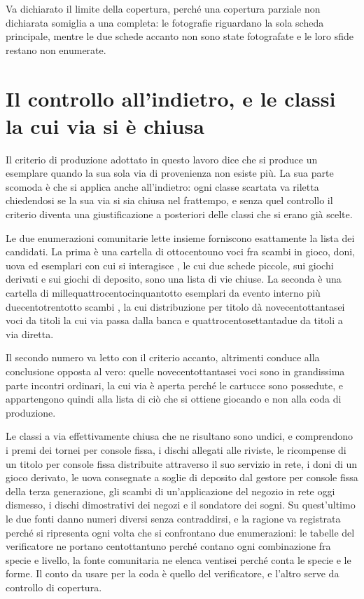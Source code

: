 Va dichiarato il limite della copertura, perché una copertura parziale non dichiarata somiglia a una completa: le fotografie riguardano la sola scheda principale, mentre le due schede accanto non sono state fotografate e le loro sfide restano non enumerate.

\section{Il controllo all'indietro, e le classi la cui via si è chiusa}

Il criterio di produzione adottato in questo lavoro dice che si produce un esemplare quando la sua sola via di provenienza non esiste più. La sua parte scomoda è che si applica anche all'indietro: ogni classe scartata va riletta chiedendosi se la sua via si sia chiusa nel frattempo, e senza quel controllo il criterio diventa una giustificazione a posteriori delle classi che si erano già scelte.

Le due enumerazioni comunitarie lette insieme forniscono esattamente la lista dei candidati. La prima è una cartella di ottocentouno voci fra scambi in gioco, doni, uova ed esemplari con cui si interagisce \cite{foglio-scambi-doni}, le cui due schede piccole, sui giochi derivati e sui giochi di deposito, sono una lista di vie chiuse. La seconda è una cartella di millequattrocentocinquantotto esemplari da evento interno più duecentotrentotto scambi \cite{foglio-eventi-interni}, la cui distribuzione per titolo dà novecentottantasei voci da titoli la cui via passa dalla banca e quattrocentosettantadue da titoli a via diretta.

Il secondo numero va letto con il criterio accanto, altrimenti conduce alla conclusione opposta al vero: quelle novecentottantasei voci sono in grandissima parte incontri ordinari, la cui via è aperta perché le cartucce sono possedute, e appartengono quindi alla lista di ciò che si ottiene giocando e non alla coda di produzione.

Le classi a via effettivamente chiusa che ne risultano sono undici, e comprendono i premi dei tornei per console fissa, i dischi allegati alle riviste, le ricompense di un titolo per console fissa distribuite attraverso il suo servizio in rete, i doni di un gioco derivato, le uova consegnate a soglie di deposito dal gestore per console fissa della terza generazione, gli scambi di un'applicazione del negozio in rete oggi dismesso, i dischi dimostrativi dei negozi e il sondatore dei sogni. Su quest'ultimo le due fonti danno numeri diversi senza contraddirsi, e la ragione va registrata perché si ripresenta ogni volta che si confrontano due enumerazioni: le tabelle del verificatore ne portano centottantuno perché contano ogni combinazione fra specie e livello, la fonte comunitaria ne elenca ventisei perché conta le specie e le forme. Il conto da usare per la coda è quello del verificatore, e l'altro serve da controllo di copertura.

